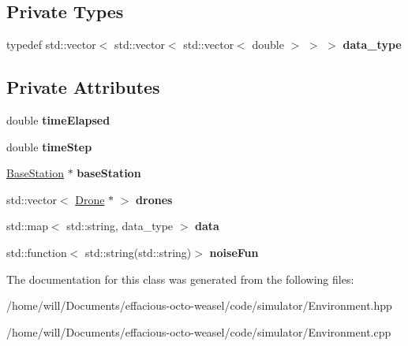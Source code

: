 \subsection*{Private Types}
\begin{DoxyCompactItemize}
\item 
typedef std\+::vector$<$ std\+::vector$<$ std\+::vector$<$ double $>$ $>$ $>$ {\bfseries data\+\_\+type}\hypertarget{class_environment_a7ac989afdd3bde4ea860c985ed1f8479}{}\label{class_environment_a7ac989afdd3bde4ea860c985ed1f8479}

\end{DoxyCompactItemize}
\subsection*{Private Attributes}
\begin{DoxyCompactItemize}
\item 
double {\bfseries time\+Elapsed}\hypertarget{class_environment_a94758a1936023963eafaa129bb84f89d}{}\label{class_environment_a94758a1936023963eafaa129bb84f89d}

\item 
double {\bfseries time\+Step}\hypertarget{class_environment_a0eac119e9f0130f836f04224612dfb16}{}\label{class_environment_a0eac119e9f0130f836f04224612dfb16}

\item 
\hyperlink{class_base_station}{Base\+Station} $\ast$ {\bfseries base\+Station}\hypertarget{class_environment_a01e059baab4daf8833a638fab15eab31}{}\label{class_environment_a01e059baab4daf8833a638fab15eab31}

\item 
std\+::vector$<$ \hyperlink{class_drone}{Drone} $\ast$ $>$ {\bfseries drones}\hypertarget{class_environment_a3119b68685b61fc60e0a76918fa83f0a}{}\label{class_environment_a3119b68685b61fc60e0a76918fa83f0a}

\item 
std\+::map$<$ std\+::string, data\+\_\+type $>$ {\bfseries data}\hypertarget{class_environment_a8f4846d547c4891a4a2493157c8f76d6}{}\label{class_environment_a8f4846d547c4891a4a2493157c8f76d6}

\item 
std\+::function$<$ std\+::string(std\+::string)$>$ {\bfseries noise\+Fun}\hypertarget{class_environment_a95650888a9bfb308a650c049a95cb6cb}{}\label{class_environment_a95650888a9bfb308a650c049a95cb6cb}

\end{DoxyCompactItemize}


The documentation for this class was generated from the following files\+:\begin{DoxyCompactItemize}
\item 
/home/will/\+Documents/effacious-\/octo-\/weasel/code/simulator/Environment.\+hpp\item 
/home/will/\+Documents/effacious-\/octo-\/weasel/code/simulator/Environment.\+cpp\end{DoxyCompactItemize}
